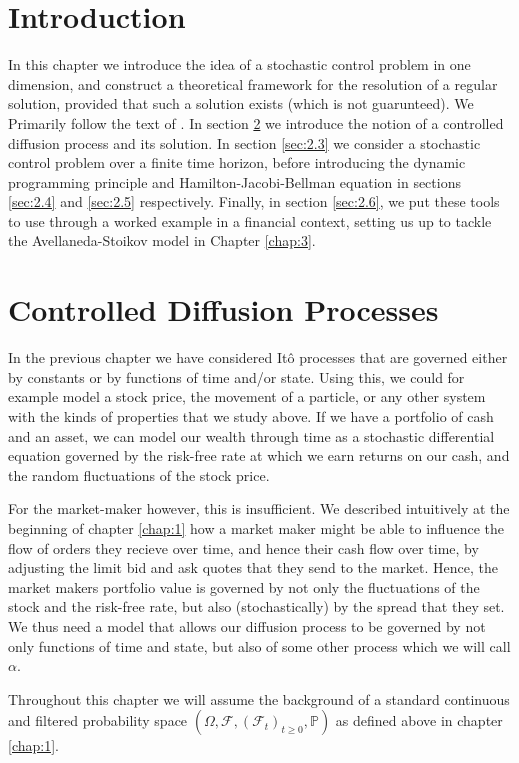 \section{Introduction}
In this chapter we introduce the idea of a stochastic control problem in one dimension, 
and construct a theoretical framework for the resolution of a regular solution, 
provided that such a solution exists (which is not guarunteed). We Primarily 
follow the text of \cite{Pham}. In section \ref{sec:2.2} we introduce the notion
of a controlled diffusion process and its solution. In section \ref{sec:2.3} we
consider a stochastic control problem over a finite time horizon, before introducing
the dynamic programming principle and Hamilton-Jacobi-Bellman equation in sections 
\ref{sec:2.4} and \ref{sec:2.5} respectively. Finally, in section \ref{sec:2.6}, we 
put these tools to use through a worked example in a financial context, setting us 
up to tackle the Avellaneda-Stoikov model in Chapter \ref{chap:3}.

\section{Controlled Diffusion Processes}\label{sec:2.2}

In the previous chapter we have considered It\^{o} processes that are governed either by constants or by
functions of time and/or state. Using this, we could for example model a stock price, the movement of a particle,
or any other system with the kinds of properties that we study above. If we have a portfolio of cash 
and an asset, we can model our wealth through time as a stochastic differential equation governed by the 
risk-free rate at which we earn returns on our cash, and the random fluctuations of the stock price. 

For the market-maker however, this is insufficient. We described intuitively at the beginning of chapter \ref{chap:1}
how a market maker might be able to influence the flow of orders they recieve over time, and hence their 
cash flow over time, by adjusting the limit bid and ask quotes that they send to the market. Hence,
the market makers portfolio value is governed by not only the fluctuations of the stock and the risk-free
rate, but also (stochastically) by the spread that they set. We thus need a model that allows our diffusion
process to be governed by not only functions of time and state, but also of some other process which we 
will call $\alpha$.

Throughout this chapter we will assume the background of a standard continuous and filtered probability space
$(\Omega,\mathcal{F},(\mathcal{F}_t)_{t\geq0},\mathbb{P})$ as defined above in chapter \ref{chap:1}.


